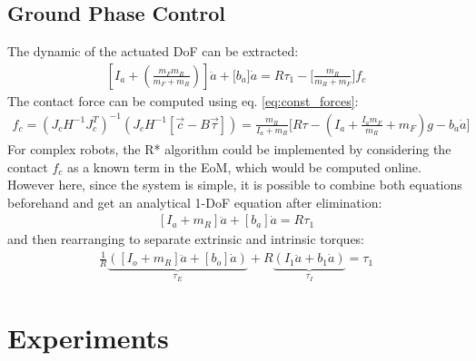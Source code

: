 \subsection{Ground Phase Control}

The dynamic of the actuated DoF can be extracted:
%
\begin{align}
\left[ I_a + \left( \frac{m_F m_R}{m_F + m_R} \right) \right] \ddot{a} + \Bigg[ b_a \Bigg] \dot{a} = R \tau_1 - \Bigg[ \frac{m_R}{m_R+m_F} \Bigg] f_c
\end{align}
%
The contact force can be computed using eq. \eqref{eq:const_forces}:
%
\begin{align}
f_c = \left( J_c H^{-1} J_c^T \right)^{-1} \left(  J_c H^{-1} [\vec{c} - B \vec{\tau} ]  \right)
= \frac{m_R}{I_a+m_R} \Bigg[ R \tau - \left(I_a + \frac{I_a m_F}{m_R} + m_F \right) g - b_a \dot{a} \Bigg]
\end{align}
%
For complex robots, the R* algorithm could be implemented by considering the contact $f_c$ as a known term in the EoM, which would be computed online. However here, since the system is simple, it is possible to combine both equations beforehand and get an analytical 1-DoF equation after elimination:
%
\begin{align}
\left[ I_a + m_R \right] \ddot{a} + \left[ b_a \right] \dot{a} = R \tau_1 
\end{align}
%
and then rearranging to separate extrinsic and intrinsic torques:
%
\begin{align} 
\frac{1}{R}
\underbrace{\left(
\left[ I_o + m_R \right] \ddot{a} + \left[ b_o \right] \dot{a}
\right)}_{\tau_E}
+ R
\underbrace{\left(
 I_1 \ddot{a} + b_1 \dot{a}
\right)}_{\tau_I}
= \tau_1
\end{align}
%



\section{Experiments}
\label{sec:case_exp}



